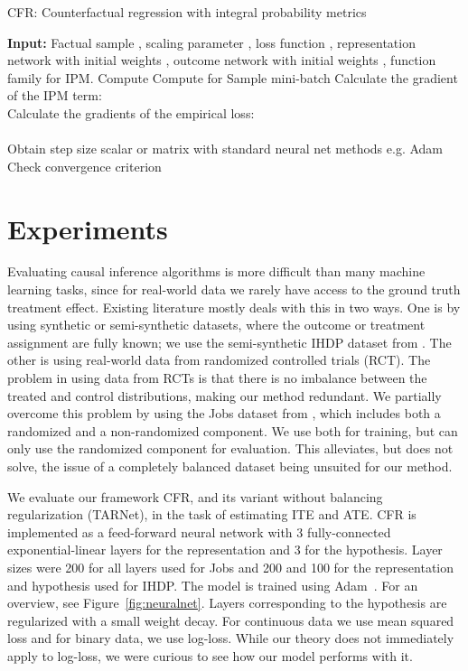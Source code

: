 \documentclass{article}
\def\tarnet{{TARNet}}
\begin{document}
\begin{algorithm}[tbp]
\caption{CFR: Counterfactual regression with integral probability metrics}
\label{alg:model}
\begin{algorithmic}[1]
  \STATE \textbf{Input:} Factual sample , scaling parameter , loss function , representation network  with initial weights , outcome network  with initial weights , function family  for IPM.
\STATE Compute 
 \STATE Compute  for 
\STATE Sample mini-batch  
    \STATE Calculate the gradient of the IPM term:\\
    {\small }
    \STATE Calculate the gradients of the empirical loss: \\
     \\
    
    \STATE Obtain step size scalar or matrix  with standard neural net methods e.g. Adam~\citep{kingma2014adam}
\STATE  
    \STATE Check convergence criterion
  \ENDWHILE
\end{algorithmic}
\end{algorithm}
 
\section{Experiments}
\label{sec:experiments}

Evaluating causal inference algorithms is more difficult than many machine learning tasks, since for real-world data we rarely have access to the ground truth treatment effect. Existing literature mostly deals with this in two ways. One is by using synthetic or semi-synthetic datasets, where the outcome or treatment assignment are fully known; we use the semi-synthetic IHDP dataset from \citet{hill2011bayesian}. The other is using real-world data from randomized controlled trials (RCT). The problem in using data from RCTs is that there is no imbalance between the treated and control distributions, making our method redundant. We partially overcome this problem by using the Jobs dataset from \citet{lalonde1986evaluating}, which includes both a randomized and a non-randomized component. We use both for training, but can only use the randomized component for evaluation. This alleviates, but does not solve, the issue of a completely balanced dataset being unsuited for our method.

We evaluate our framework CFR, and its variant without balancing regularization (\tarnet{}), in the task of estimating ITE and ATE. CFR is implemented as a feed-forward neural network with 3 fully-connected exponential-linear layers for the representation and 3 for the hypothesis. Layer sizes were 200 for all layers used for Jobs and 200 and 100 for the representation and hypothesis used for IHDP. The model is trained using Adam~\citep{kingma2014adam}. For an overview, see Figure~\ref{fig:neuralnet}. Layers corresponding to the hypothesis are regularized with a small  weight decay.  For continuous data we use mean squared loss and for binary data, we use log-loss. While our theory does not immediately apply to log-loss, we were curious to see how our model performs with it. 
\end{document}
